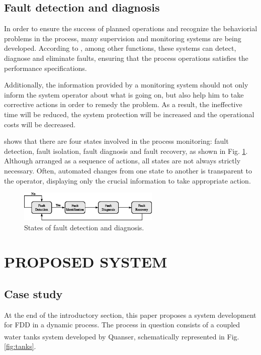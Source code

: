 \documentclass[10pt,fleqn,a4paper]{article}
\newcommand{\reg}{\textsuperscript{\textregistered}}
\begin{document}
\subsection{Fault detection and diagnosis}
In order to ensure the success of planned operations and recognize the
behaviorial problems in the process, many supervision and monitoring systems are
being developed. According to \citet{chiang:2001}, among other functions, these
systems can detect, diagnose and eliminate faults, ensuring that the process
operations satisfies the performance specifications.

Additionally, the information provided by a monitoring system should not only
inform the system operator about what is going on, but also help him to take
corrective actions in order to remedy the problem. As a result, the ineffective
time will be reduced, the system protection will be increased and the
operational costs will be decreased.

\citet{chiang:2001} shows that there are four states involved in the process
monitoring: fault detection, fault isolation, fault diagnosis and fault
recovery, as shown in Fig. \ref{fig:states}. Although arranged as a sequence of
actions, all states are not always strictly necessary. Often, automated changes
from one state to another is transparent to the operator, displaying only the
crucial information to take appropriate action.

\begin{figure}[htb]
\centering
    \includegraphics[width=0.6\textwidth]{imgs/states}
    \caption{States of fault detection and diagnosis.}
    \label{fig:states}
\end{figure}

\section{PROPOSED SYSTEM}\label{sec:proposed}
\subsection{Case study}
At the end of the introductory section, this paper proposes a system development
for FDD in a dynamic process. The process in question consists of a coupled
water tanks system developed by Quanser\reg, schematically represented in Fig.
\ref{fig:tanks}.
\end{document}
